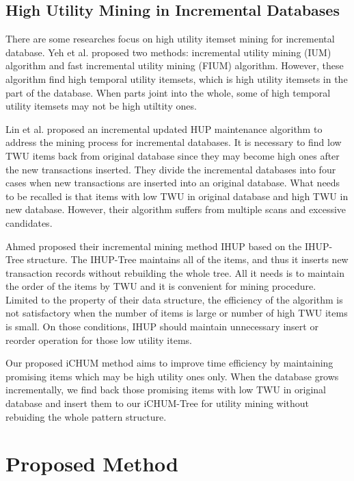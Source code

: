 \documentclass[runningheads,a4paper]{llncs}
\begin{document}
\subsection{High Utility Mining in Incremental Databases}
There are some researches focus on high utility itemset mining for incremental database. Yeh et al. \cite{Yeh:IUM} proposed two methods: incremental utility mining (IUM) algorithm and fast incremental utility mining (FIUM) algorithm. However, these algorithm find high temporal utility itemsets, which is high utility itemsets in the part of the database. When parts joint into the whole, some of high temporal utility itemsets may not be high utiltity ones. 

Lin et al. \cite{Lin:dynamic-databases,Lin:incremental-hui} proposed an incremental updated HUP maintenance algorithm to address the mining process for incremental databases. It is necessary to find low TWU items back from original database since they may become high ones after the new transactions inserted. They divide the incremental databases into four cases when new transactions are inserted into an original database. What needs to be recalled is that items with low TWU in original database and high TWU in new database. However, their algorithm suffers from multiple scans and excessive candidates.

Ahmed \cite{Ahmed:IHUP} proposed their incremental mining method IHUP based on the IHUP-Tree structure. The IHUP-Tree maintains all of the items, and thus it inserts new transaction records without rebuilding the whole tree. All it needs is to maintain the order of the items by TWU and it is convenient for mining procedure. Limited to the property of their data structure, the efficiency of the algorithm is not satisfactory when the number of items is large or number of high TWU items is small. On those conditions, IHUP should maintain unnecessary insert or reorder operation for those low utility items.

Our proposed iCHUM method aims to improve time efficiency by maintaining promising items which may be high utility ones only. When the database grows incrementally, we find back those promising items with low TWU in original database and insert them to our iCHUM-Tree for utility mining without rebuiding the whole pattern structure.

\section{Proposed Method}
\end{document}
